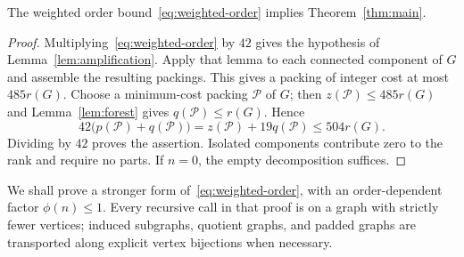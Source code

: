\begin{proposition}\label{prop:weighted-reduction}
The weighted order bound~\eqref{eq:weighted-order} implies
Theorem~\ref{thm:main}.
\end{proposition}
\begin{proof}
Multiplying~\eqref{eq:weighted-order} by $42$ gives the hypothesis of
Lemma~\ref{lem:amplification}. Apply that lemma to each connected component
of $G$ and assemble the resulting packings. This gives a packing of integer
cost at most $485r(G)$. Choose a minimum-cost packing $\mathcal P$ of $G$;
then $z(\mathcal P)\le485r(G)$ and Lemma~\ref{lem:forest} gives
$q(\mathcal P)\le r(G)$. Hence
\[
 42\bigl(p(\mathcal P)+q(\mathcal P)\bigr)
   =z(\mathcal P)+19q(\mathcal P)
   \le504r(G).
\]
Dividing by $42$ proves the assertion. Isolated components contribute zero
to the rank and require no parts. If $n=0$, the empty decomposition suffices.
\end{proof}

We shall prove a stronger form of~\eqref{eq:weighted-order}, with an
order-dependent factor $\phi(n)\le1$. Every recursive call in that proof
is on a graph with strictly fewer vertices; induced subgraphs, quotient
graphs, and padded graphs are transported along explicit vertex bijections
when necessary.

